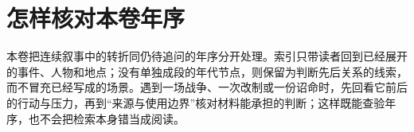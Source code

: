 \chapter{怎样核对本卷年序}
\label{app:ledger-navigation}

本卷把连续叙事中的转折同仍待追问的年序分开处理。索引只带读者回到已经展开的事件、人物和地点；没有单独成段的年代节点，则保留为判断先后关系的线索，而不冒充已经写成的场景。遇到一场战争、一次改制或一份诏命时，先回看它前后的行动与压力，再到“来源与使用边界”核对材料能承担的判断；这样既能查验年序，也不会把检索本身错当成阅读。

